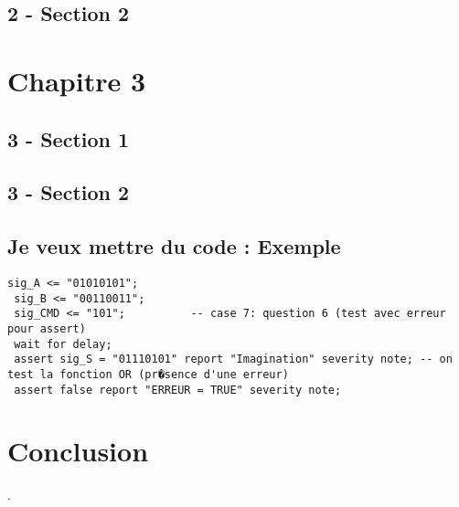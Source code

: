 \documentclass[11pt,a4paper]{report}
\begin{document}
\section{2 - Section 2}

\chapter{Chapitre 3}

\section{3 - Section 1}

\section{3 - Section 2}

\section{Je veux mettre du code : Exemple}

\begin{lstlisting}[label=un-label,caption=Titre du code : ex VHDL ]
 sig_A <= "01010101";
 sig_B <= "00110011";		 
 sig_CMD <= "101";			-- case 7: question 6 (test avec erreur pour assert)		   
 wait for delay;
 assert sig_S = "01110101" report "Imagination" severity note; -- on test la fonction OR (pr�sence d'une erreur)
 assert false report "ERREUR = TRUE" severity note;
\end{lstlisting}


\chapter*{Conclusion}
.



%

\end{document}
